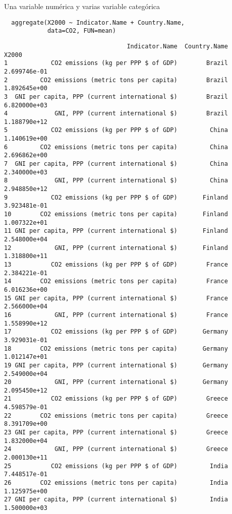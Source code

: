 \documentclass[xcolor={usenames,svgnames,dvipsnames}]{beamer}
\begin{document}
\begin{frame}[fragile,label=sec-2-2-3]{Una variable numérica y varias variable categórica}
 \lstset{language=R,label= ,caption= ,numbers=none}
\begin{lstlisting}
  aggregate(X2000 ~ Indicator.Name + Country.Name,
            data=CO2, FUN=mean)
\end{lstlisting}

\begin{verbatim}
                                  Indicator.Name  Country.Name        X2000
1            CO2 emissions (kg per PPP $ of GDP)        Brazil 2.699746e-01
2         CO2 emissions (metric tons per capita)        Brazil 1.892645e+00
3  GNI per capita, PPP (current international $)        Brazil 6.820000e+03
4             GNI, PPP (current international $)        Brazil 1.188790e+12
5            CO2 emissions (kg per PPP $ of GDP)         China 1.140619e+00
6         CO2 emissions (metric tons per capita)         China 2.696862e+00
7  GNI per capita, PPP (current international $)         China 2.340000e+03
8             GNI, PPP (current international $)         China 2.948850e+12
9            CO2 emissions (kg per PPP $ of GDP)       Finland 3.923481e-01
10        CO2 emissions (metric tons per capita)       Finland 1.007322e+01
11 GNI per capita, PPP (current international $)       Finland 2.548000e+04
12            GNI, PPP (current international $)       Finland 1.318800e+11
13           CO2 emissions (kg per PPP $ of GDP)        France 2.384221e-01
14        CO2 emissions (metric tons per capita)        France 6.016236e+00
15 GNI per capita, PPP (current international $)        France 2.566000e+04
16            GNI, PPP (current international $)        France 1.558990e+12
17           CO2 emissions (kg per PPP $ of GDP)       Germany 3.929031e-01
18        CO2 emissions (metric tons per capita)       Germany 1.012147e+01
19 GNI per capita, PPP (current international $)       Germany 2.549000e+04
20            GNI, PPP (current international $)       Germany 2.095450e+12
21           CO2 emissions (kg per PPP $ of GDP)        Greece 4.598579e-01
22        CO2 emissions (metric tons per capita)        Greece 8.391709e+00
23 GNI per capita, PPP (current international $)        Greece 1.832000e+04
24            GNI, PPP (current international $)        Greece 2.000130e+11
25           CO2 emissions (kg per PPP $ of GDP)         India 7.448517e-01
26        CO2 emissions (metric tons per capita)         India 1.125975e+00
27 GNI per capita, PPP (current international $)         India 1.500000e+03

\end{verbatim}
\end{frame}
\end{document}
